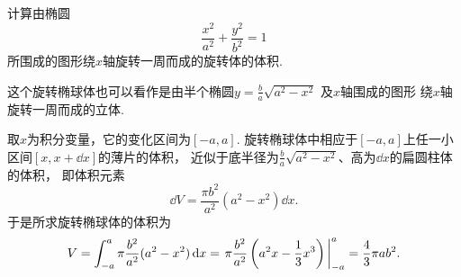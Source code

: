 \begin{example}
计算由椭圆\begin{equation*}
	\frac{x^2}{a^2}+\frac{y^2}{b^2}=1
\end{equation*}所围成的图形绕\(x\)轴旋转一周而成的旋转体的体积.
\begin{solution}
这个旋转椭球体也可以看作是由半个椭圆\(y = \frac{b}{a} \sqrt{a^2-x^2}\)
及\(x\)轴围成的图形
绕\(x\)轴旋转一周而成的立体.

取\(x\)为积分变量，它的变化区间为\([-a,a]\).
旋转椭球体中相应于\([-a,a]\)上任一小区间\([x,x+\dd{x}]\)的薄片的体积，
近似于底半径为\(\frac{b}{a} \sqrt{a^2-x^2}\)、高为\(\dd{x}\)的扁圆柱体的体积，
即体积元素\begin{equation*}
	\dd{V} = \frac{\pi b^2}{a^2} (a^2-x^2) \dd{x}.
\end{equation*}
于是所求旋转椭球体的体积为\begin{equation*}
	V = \int_{-a}^a \pi \frac{b^2}{a^2} (a^2-x^2) \dd{x}
	= \eval{\pi \frac{b^2}{a^2} \left(a^2x-\frac13x^3\right)}_{-a}^a
	= \frac43 \pi a b^2.
\end{equation*}
\end{solution}
\end{example}

